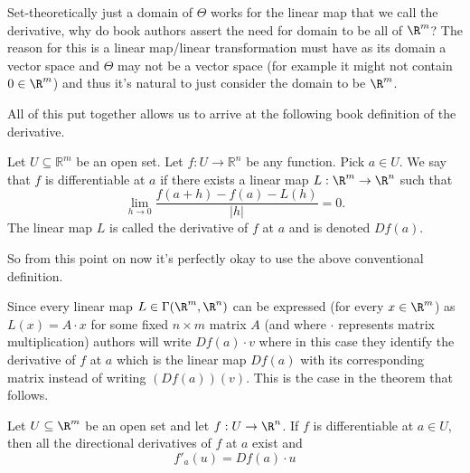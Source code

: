 		\begin{point}
			Set-theoretically just a domain of $\Theta$ works for the linear map that we call the derivative, why do book authors assert the need for domain to be all of $\R^m$? The reason for this is a linear map/linear transformation must have as its domain a vector space and $\Theta$ may not be a vector space (for example it might not contain $0 \in \R^m$) and thus it's natural to just consider the domain to be $\R^m$.
		\end{point}

		
		
		All of this put together allows us to arrive at the following book definition of the derivative.
		
		
		\begin{definition}
			Let $U \subseteq \mathbb{R}^m$ be an open set. Let $f : U \to \mathbb{R}^n$ be any function. Pick $a \in U$. We say that $f$ is differentiable at $a$ if there exists a linear map $L : \R^m \to \R^n$ such that $$\lim_{h \to 0}\frac{f(a+h)-f(a)-L(h)}{|h|}=0.$$ The linear map $L$ is called the derivative of $f$ at $a$ and is denoted $Df(a)$.
		\end{definition}
		
		So from this point on now it's perfectly okay to use the above conventional definition.
		
		\begin{point}
				 Since every linear map $L \in \Gamma(\R^m, \R^n)$ can be expressed (for every $x \in \R^m$) as $L(x) = A \cdot x$ for some fixed $n \times m$ matrix $A$ (and where $\cdot$ represents matrix multiplication) authors will write $Df(a)\cdot v$ where in this case they identify the derivative of $f$ at $a$ which is the linear map $Df(a)$ with its corresponding matrix instead of writing $\left(Df(a)\right)(v)$. This is the case in the theorem that follows.
		\end{point}
		
		\begin{theorem}
			Let $U \subseteq \R^m$  be an open set and let  $f : U \to \R^n$. If $f$ is differentiable at $a \in U$, then all the directional derivatives of $f$ at $a$ exist and $$f'_a(u) = Df(a) \cdot u$$ 
		\end{theorem}
		
		
		